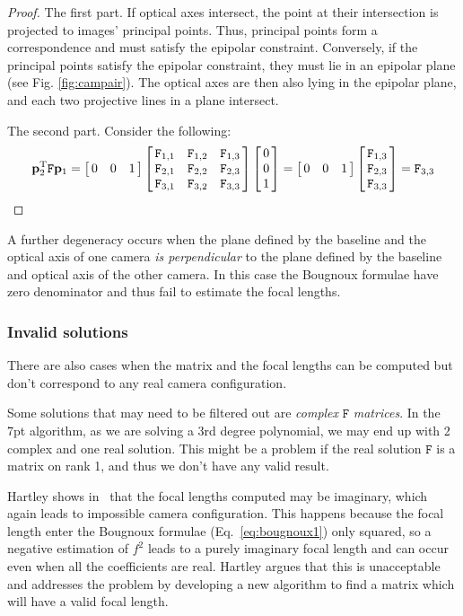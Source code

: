 \begin{proof}
 The first part. If optical axes intersect, the point at their intersection is projected to images' principal points. Thus, principal points form a correspondence and must satisfy the epipolar constraint. Conversely, if the principal points satisfy the epipolar constraint, they must lie in an epipolar plane (see Fig. \ref{fig:campair}). The optical axes are then also lying in the epipolar plane, and each two projective lines in a plane intersect.
 
 The second part. Consider the following: \[ \mathbf{p}_2^\T \mathtt{F} \mathbf{p}_1 = \mat{ccc}{0 & 0 & 1} \mat{ccc}{
 \mathtt{F}_{1,1} & \mathtt{F}_{1,2} & \mathtt{F}_{1,3} \\ \mathtt{F}_{2,1} & \mathtt{F}_{2,2} & \mathtt{F}_{2,3} \\ \mathtt{F}_{3,1} & \mathtt{F}_{3,2} & \mathtt{F}_{3,3}}
 \mat{ccc}{0 \\ 0 \\ 1} = \mat{ccc}{0 & 0 & 1} \mat{ccc}{\mathtt{F}_{1,3} \\ \mathtt{F}_{2,3} \\ \mathtt{F}_{3,3}} = \mathtt{F}_{3,3}\]
\end{proof}

A further degeneracy \cite{HartZiss} occurs when  the plane defined by the baseline and the optical axis of one camera \textit{is perpendicular} to the plane defined by the baseline and optical axis of the other camera. In this case the Bougnoux formulae have zero denominator and thus fail to estimate the focal lengths.

\subsubsection{Invalid solutions}
There are also cases when the matrix and the focal lengths can be computed but don't correspond to any real camera configuration.

Some solutions that may need to be filtered out are \textit{complex} $\mathtt{F}$ \textit{matrices}. In the 7pt algorithm, as we are solving a 3rd degree polynomial, we may end up with 2 complex and one real solution. This might be a problem if the real solution $\mathtt{F}$ is a matrix on rank 1, and thus we don't have any valid result.

Hartley shows in~\cite{HartleyPriors} that the focal lengths computed may be imaginary, which again leads to impossible camera configuration. This happens because the focal length enter the Bougnoux formulae (Eq.~\ref{eq:bougnoux1}) only squared, so a negative estimation of $f^2$ leads to a purely imaginary focal length and can occur even when all the coefficients are real. Hartley argues that this is unacceptable and addresses the problem by developing a new algorithm to find a matrix which will have a valid focal length. 

